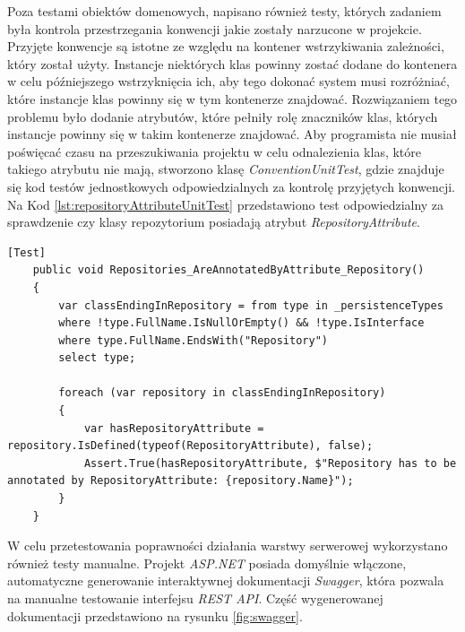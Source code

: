 \documentclass[a4paper,twoside,12pt]{book}
\begin{document}
Poza testami obiektów domenowych, napisano również testy, których zadaniem była kontrola przestrzegania konwencji jakie zostały narzucone w projekcie. Przyjęte konwencje są istotne ze względu na kontener wstrzykiwania zależności, który został użyty. Instancje niektórych klas powinny zostać dodane do kontenera w celu późniejszego wstrzyknięcia ich, aby tego dokonać system musi rozróżniać, które instancje klas powinny się w tym kontenerze znajdować. Rozwiązaniem tego problemu było dodanie atrybutów, które pełniły rolę znaczników klas, których instancje powinny się w takim kontenerze znajdować. Aby programista nie musiał poświęcać czasu na przeszukiwania projektu w celu odnalezienia klas, które takiego atrybutu nie mają, stworzono klasę \textit{ConventionUnitTest}, gdzie znajduje się kod testów jednostkowych odpowiedzialnych za kontrolę przyjętych konwencji. Na Kod \ref{lst:repositoryAttributeUnitTest} przedstawiono test odpowiedzialny za sprawdzenie czy klasy repozytorium posiadają atrybut \textit{RepositoryAttribute}.
\begin{lstlisting}[caption={Przykładowy test klasy \textit{ConventionUnitTest}}, label={lst:repositoryAttributeUnitTest}]
	[Test]
	public void Repositories_AreAnnotatedByAttribute_Repository()
	{
		var classEndingInRepository = from type in _persistenceTypes
		where !type.FullName.IsNullOrEmpty() && !type.IsInterface
		where type.FullName.EndsWith("Repository")
		select type;
		
		foreach (var repository in classEndingInRepository)
		{
			var hasRepositoryAttribute = repository.IsDefined(typeof(RepositoryAttribute), false);
			Assert.True(hasRepositoryAttribute, $"Repository has to be annotated by RepositoryAttribute: {repository.Name}");
		}
	}
\end{lstlisting}
W celu przetestowania poprawności działania warstwy serwerowej wykorzystano również testy manualne. Projekt \textit{ASP.NET} posiada domyślnie włączone, automatyczne generowanie interaktywnej dokumentacji \textit{Swagger}, która pozwala na manualne testowanie interfejsu \textit{REST API}. Część wygenerowanej dokumentacji przedstawiono na rysunku \ref{fig:swagger}.
\end{document}
